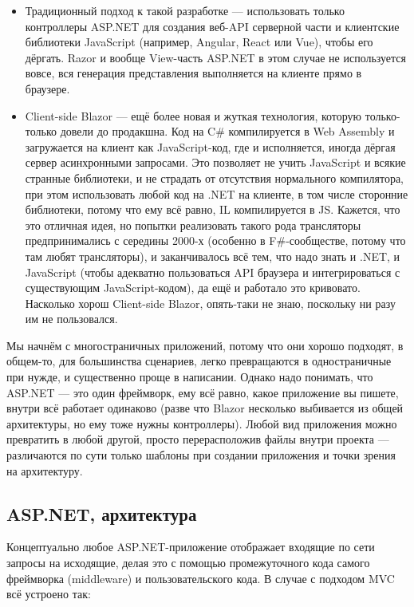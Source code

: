 \documentclass[a5paper]{article}
\begin{document}
\begin{itemize}
\begin{itemize}
        \item Традиционный подход к такой разработке --- использовать только контроллеры ASP.NET для создания веб-API серверной части и клиентские библиотеки JavaScript (например, Angular, React или Vue), чтобы его дёргать. Razor и вообще View-часть ASP.NET в этом случае не используется вовсе, вся генерация представления выполняется на клиенте прямо в браузере.
        \item Client-side Blazor --- ещё более новая и жуткая технология, которую только-только довели до продакшна. Код на C\# компилируется в Web Assembly и загружается на клиент как JavaScript-код, где и исполняется, иногда дёргая сервер асинхронными запросами. Это позволяет не учить JavaScript и всякие странные библиотеки, и не страдать от отсутствия нормального компилятора, при этом использовать любой код на .NET на клиенте, в том числе сторонние библиотеки, потому что ему всё равно, IL компилируется в JS. Кажется, что это отличная идея, но попытки реализовать такого рода трансляторы предпринимались с середины 2000-х (особенно в F\#-сообществе, потому что там любят трансляторы), и заканчивалось всё тем, что надо знать и .NET, и JavaScript (чтобы адекватно пользоваться API браузера и интегрироваться с существующим JavaScript-кодом), да ещё и работало это кривовато. Насколько хорош Client-side Blazor, опять-таки не знаю, поскольку ни разу им не пользовался.
    \end{itemize}
\end{itemize}

Мы начнём с многостраничных приложений, потому что они хорошо подходят, в общем-то, для большинства сценариев, легко превращаются в одностраничные при нужде, и существенно проще в написании. Однако надо понимать, что ASP.NET --- это один фреймворк, ему всё равно, какое приложение вы пишете, внутри всё работает одинаково (разве что Blazor несколько выбивается из общей архитектуры, но ему тоже нужны контроллеры). Любой вид приложения можно превратить в любой другой, просто перерасположив файлы внутри проекта --- различаются по сути только шаблоны при создании приложения и точки зрения на архитектуру.

\subsection{ASP.NET, архитектура}

Концептуально любое ASP.NET-приложение отображает входящие по сети запросы на исходящие, делая это с помощью промежуточного кода самого фреймворка (middleware) и пользовательского кода. В случае с подходом MVC всё устроено так:
\end{document}
